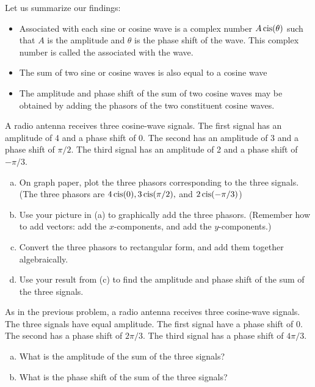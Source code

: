 Let us summarize our findings:
\begin{itemize}
\item
Associated with each sine or cosine wave is a complex number $A \operatorname{cis}( \theta) $ such that $A$ is the amplitude and $\theta$ is the phase shift of the wave. This complex number is called the  associated with the wave.
\item
The sum of two sine or cosine waves is also equal to a cosine wave
\item
The amplitude and phase shift of the sum of two cosine waves may be obtained by adding the phasors of the two constituent cosine waves.
\end{itemize}

\begin{exercise}{46}
A radio antenna receives three cosine-wave signals. The first signal has an amplitude of 4 and a phase shift of 0. The second has an amplitude of 3 and a phase shift of $\pi/2$. The third signal has an amplitude of 2 and a phase shift of $-\pi/3$.
\begin{enumerate}[(a)]
\item
On graph paper,  plot the three phasors corresponding to the three signals. (The three phasors are $4 \operatorname{cis}(0), 3 \operatorname{cis}(\pi/2),$ and $2 \operatorname{cis}(-\pi/3)$)
\item
Use your picture in (a) to graphically add the three phasors. (Remember how to add vectors:  add the $x$-components, and add the $y$-components.)
\item
Convert the three phasors to rectangular form, and add them together algebraically.
\item
Use your result from (c) to find the amplitude and phase shift of the sum of the three signals.
\end{enumerate}
\end{exercise}


\begin{exercise}{47}
As in the previous problem, a radio antenna receives three cosine-wave signals. The three signals have equal amplitude. The first signal have a phase shift of 0. The second has a phase shift of $2\pi/3$. The third signal has  a phase shift of $4\pi/3$.
\begin{enumerate}[(a)]
\item
 What is the amplitude of the sum of the three signals?
\item
What is the phase shift of the sum of the three signals?
\end{enumerate}
\end{exercise}

